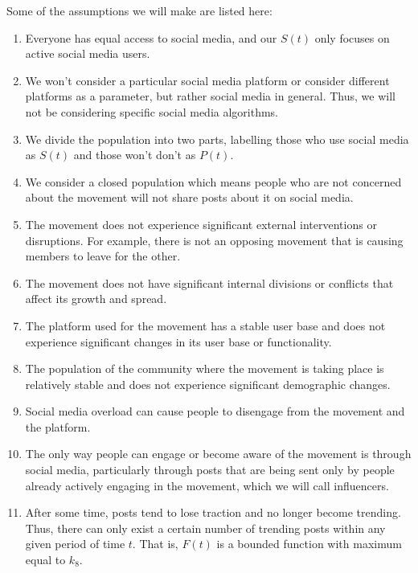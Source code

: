 \documentclass{article}
\begin{document}
    Some of the assumptions we will make are listed here:
    \begin{enumerate}
    \item  Everyone has equal access to social media, and our $S(t)$ only focuses on active social media users.
    
    \item We won't consider a particular social media platform or consider different platforms as a parameter, but rather social media in general. Thus, we will not be considering specific social media algorithms.
    
    \item We divide the population into two parts, labelling those who use social media as $S(t)$ and those won't don't as $P(t)$. 
    
    \item We consider a closed population which means people who are not concerned about the movement will not share posts about it on social media. 
    
    \item The movement does not experience significant external interventions or disruptions. For example, there is not an opposing movement that is causing members to leave for the other. 
    
    \item The movement does not have significant internal divisions or conflicts that affect its growth and spread.
    
    \item The platform used for the movement has a stable user base and does not experience significant changes in its user base or functionality.

    \item The population of the community where the movement is taking place is relatively stable and does not experience significant demographic changes.

    \item Social media overload can cause people to disengage from the movement and the platform.
    
    \item  The only way people can engage or become aware of the movement is through social media, particularly through posts that are being sent only by people already actively engaging in the movement, which we will call influencers. 
    
    \item  After some time, posts tend to lose traction and no longer become trending. Thus, there can only exist a certain number of trending posts within any given period of time $t$. That is, $F(t)$ is a bounded function with maximum equal to $k_8$. 


\end{enumerate}
\end{document}
